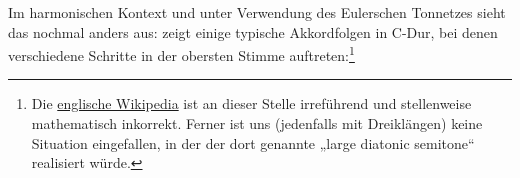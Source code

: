 Im harmonischen Kontext und unter Verwendung des Eulerschen Tonnetzes sieht das
nochmal anders aus:  zeigt einige typische Akkordfolgen in
C-Dur, bei denen verschiedene Schritte in der obersten Stimme
auftreten:\footnote{Die
  \href{https://en.wikipedia.org/wiki/Semitone\#Just_intonation}{englische
    Wikipedia} ist an dieser Stelle irreführend und stellenweise mathematisch
  inkorrekt. Ferner ist uns (jedenfalls mit Dreiklängen) keine Situation
  eingefallen, in der der dort genannte „large diatonic semitone“ realisiert
  würde.}
